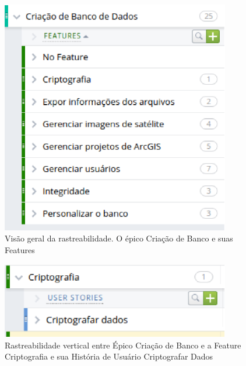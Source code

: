 \begin{figure}[!htb]
    \centering
    \includegraphics[width=10cm, keepaspectratio=false]{figuras/rastreabilidade/vertical/features.eps}
    \caption{Visão geral da rastreabilidade. O épico Criação de Banco e suas Features}
  \end{figure}

  \begin{figure}[!htb]
    \centering
    \includegraphics[width=10cm, keepaspectratio=false]{figuras/rastreabilidade/vertical/feature_criptografia.eps}
    \caption{Rastreabilidade vertical entre Épico Criação de Banco e a Feature Criptografia e sua História de Usuário Criptografar Dados}
  \end{figure}

